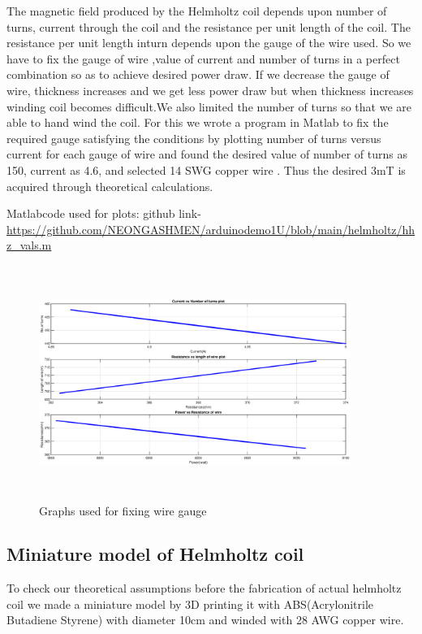 The magnetic field produced by the Helmholtz coil depends upon number of turns, current through the coil and the resistance per unit length of the coil. The resistance per unit length inturn depends upon the gauge of the wire used. So we have to fix the gauge of wire ,value of current and number of turns in a perfect combination so as to achieve desired power draw. If we decrease the gauge of wire, thickness increases and we get less power draw but when thickness increases winding coil becomes difficult.We also limited the number of turns so that we are able to hand wind the coil. For this we wrote a program in Matlab to fix the required gauge satisfying the conditions by plotting number of turns versus current for each gauge of wire and found the desired value of number of turns as 150, current as 4.6, and selected 14 SWG copper wire . Thus the desired 3mT is acquired through theoretical calculations.
\vspace{10pt}
\par Matlabcode used for plots:
github link- \url{https://github.com/NEONGASHMEN/arduinodemo1U/blob/main/helmholtz/hhz_vals.m}
 
\begin{figure}[h!]
	\centering
	\includegraphics[width=4in,height=3in]{images/fix_guage.eps}
	\caption{Graphs used for fixing wire gauge}
	\label{fig-wVt}
\end{figure}

\subsection{Miniature model of Helmholtz coil}
To check our theoretical assumptions before the fabrication of actual helmholtz coil we made a miniature model by 3D printing it with ABS(Acrylonitrile Butadiene Styrene) with diameter 10cm and winded with 28 AWG copper wire.

